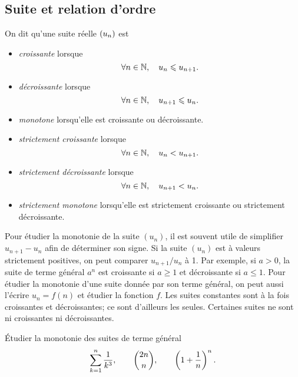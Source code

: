\documentclass{magnolia}
\begin{document}
\subsection{Suite et relation d'ordre}

\begin{definition}[utile=-3]
On dit qu'une suite réelle $\left(u_n\right)$ est
\begin{itemize}
\item \emph{croissante} lorsque
  \[\forall n\in\mathbb{N} ,\quad u_n \leqslant u_{n+1}.\]
\item \emph{décroissante} lorsque
  \[\forall n\in\mathbb{N} ,\quad u_{n+1} \leqslant u_n.\]
\item \emph{monotone} lorsqu'elle est croissante ou décroissante.
\item \emph{strictement croissante} lorsque
  \[\forall n\in\mathbb{N} ,\quad u_n < u_{n+1}.\]
\item \emph{strictement décroissante} lorsque
  \[\forall n\in\mathbb{N} ,\quad u_{n+1} < u_n.\]
\item \emph{strictement monotone} lorsqu'elle est strictement croissante ou
  strictement décroissante.
\end{itemize}
\end{definition}

\begin{remarques}
\remarque Pour étudier la monotonie de la suite $(u_n)$, il est souvent utile
  de simplifier $u_{n+1}-u_n$ afin de déterminer son signe.
  Si la suite $(u_n)$ est à valeurs strictement positives, on peut comparer
  $u_{n+1}/u_n$ à 1. Par exemple, si $a>0$, la suite de terme général $a^n$ est
  croissante si $a\geq 1$ et décroissante si $a\leq 1$.
\remarque Pour étudier la monotonie d'une suite donnée par son terme général,
  on peut aussi l'écrire $u_n=f(n)$ et étudier la fonction $f$.
\remarque Les suites constantes sont à la fois croissantes et décroissantes;
  ce sont d'ailleurs les seules. Certaines suites ne sont ni croissantes
  ni décroissantes.
\end{remarques}

\begin{exoUnique}
\exo Étudier la monotonie des suites de terme général
  \[\sum_{k=1}^n \frac{1}{k^3}, \qquad \binom{2n}{n}, %
    \qquad \p{1+\frac{1}{n}}^n.\]
\end{exoUnique}
\end{document}
